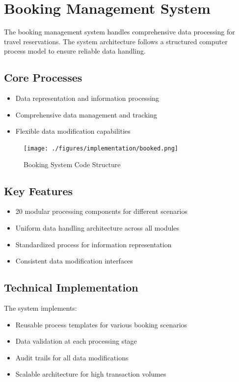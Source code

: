 \section{Booking Management System}

The booking management system handles comprehensive data processing for travel reservations. The system architecture follows a structured computer process model to ensure reliable data handling.

\subsection{Core Processes}
\begin{itemize}
    \item Data representation and information processing
    \item Comprehensive data management and tracking
    \item Flexible data modification capabilities
\end{itemize}

\begin{figure}[H]
    \centering
    \texttt{[image: ./figures/implementation/booked.png]}
    \caption{Booking System Code Structure}
    \label{fig:booking_system}
\end{figure}

\subsection{Key Features}
\begin{itemize}
    \item 20 modular processing components for different scenarios
    \item Uniform data handling architecture across all modules
    \item Standardized process for information representation
    \item Consistent data modification interfaces
\end{itemize}

\subsection{Technical Implementation}
The system implements:
\begin{itemize}
    \item Reusable process templates for various booking scenarios
    \item Data validation at each processing stage
    \item Audit trails for all data modifications
    \item Scalable architecture for high transaction volumes
\end{itemize}

